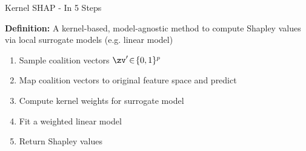 \documentclass[11pt,compress,t,notes=noshow, aspectratio=169, xcolor=table]{beamer}
\begin{document}
\begin{frame}{Kernel SHAP - In 5 Steps}

\textbf{Definition:} A kernel-based, model-agnostic method to compute Shapley values via local surrogate models (e.g. linear model)\\
\vspace{1cm}
\begin{enumerate}
    \item Sample coalition vectors  \(\zv'\!\in\!\{0,1\}^p\)
    
    \item Map coalition vectors to original feature space and predict
    
    
    \item Compute kernel weights for surrogate model
    
    \item Fit a weighted linear model 

    \item Return Shapley values
    
    
\end{enumerate}

\end{frame}
\end{document}
